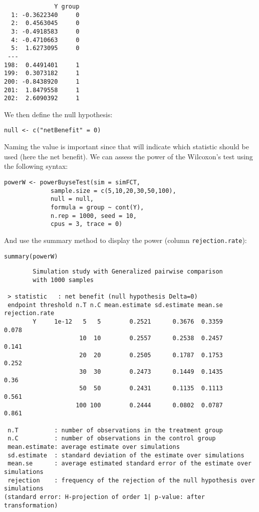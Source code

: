 \documentclass[12pt]{article}
\begin{document}
\begin{verbatim}
              Y group
  1: -0.3622340     0
  2:  0.4563045     0
  3: -0.4918583     0
  4: -0.4710663     0
  5:  1.6273095     0
 ---                 
198:  0.4491401     1
199:  0.3073182     1
200: -0.8438920     1
201:  1.8479558     1
202:  2.6090392     1
\end{verbatim}

We then define the null hypothesis:
\lstset{language=r,label= ,caption= ,captionpos=b,numbers=none}
\begin{lstlisting}
null <- c("netBenefit" = 0)
\end{lstlisting}

Naming the value is important since that will indicate which statistic
should be used (here the net benefit). We can assess the power of the
Wilcoxon's test using the following syntax:
\lstset{language=r,label= ,caption= ,captionpos=b,numbers=none}
\begin{lstlisting}
powerW <- powerBuyseTest(sim = simFCT, 
			 sample.size = c(5,10,20,30,50,100),
			 null = null,
			 formula = group ~ cont(Y), 
			 n.rep = 1000, seed = 10,
			 cpus = 3, trace = 0)
\end{lstlisting}

\clearpage

And use the summary method to display the power (column
\texttt{rejection.rate}):
\lstset{language=r,label= ,caption= ,captionpos=b,numbers=none}
\begin{lstlisting}
summary(powerW)
\end{lstlisting}

\begin{verbatim}
        Simulation study with Generalized pairwise comparison
        with 1000 samples

 > statistic   : net benefit (null hypothesis Delta=0)
 endpoint threshold n.T n.C mean.estimate sd.estimate mean.se rejection.rate
        Y     1e-12   5   5        0.2521      0.3676  0.3359          0.078
                     10  10        0.2557      0.2538  0.2457          0.141
                     20  20        0.2505      0.1787  0.1753          0.252
                     30  30        0.2473      0.1449  0.1435           0.36
                     50  50        0.2431      0.1135  0.1113          0.561
                    100 100        0.2444      0.0802  0.0787          0.861

 n.T          : number of observations in the treatment group
 n.C          : number of observations in the control group
 mean.estimate: average estimate over simulations
 sd.estimate  : standard deviation of the estimate over simulations
 mean.se      : average estimated standard error of the estimate over simulations
 rejection    : frequency of the rejection of the null hypothesis over simulations
(standard error: H-projection of order 1| p-value: after transformation)
\end{verbatim}
\end{document}
